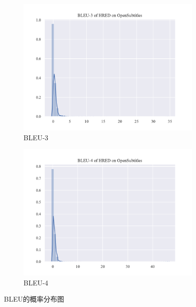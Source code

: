 \begin{figure}
\begin{subfigure}{0.5\linewidth}
        \includegraphics[width=\linewidth]{figure/distplot/opensub/hred/bleu_3/plot.pdf}
        \caption{BLEU-3}
    \end{subfigure}%
    \begin{subfigure}{0.5\linewidth}
        \centering
        \includegraphics[width=\linewidth]{figure/distplot/opensub/hred/bleu_4/plot.pdf}
        \caption{BLEU-4}
    \end{subfigure}
    \centering
    \caption{BLEU的概率分布图}
    \label{fig:BLEU_dist}
\end{figure}